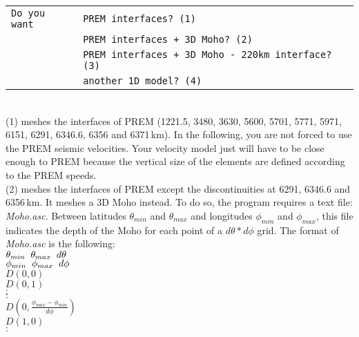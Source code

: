 \begin{itemize}[topsep=2pt,itemsep=4pt]
\hspace*{-0.3cm}
\begin{tabular}{ll}
\texttt{Do you want}
& \texttt{PREM interfaces? (1)}\\
& \texttt{PREM interfaces + 3D Moho? (2)}\\
& \texttt{PREM interfaces + 3D Moho - 220km interface? (3)}\\
& \texttt{another 1D model? (4)}
\end{tabular}\\
(1) meshes the interfaces of PREM (1221.5, 3480, 3630, 5600, 5701, 5771, 5971, 6151, 6291, 6346.6, 6356 and 6371\,km). In the following, you are not forced to use the PREM seismic velocities. Your velocity model just will have to be close enough to PREM because the vertical size of the elements are defined according to the PREM speeds.\\
(2) meshes the interfaces of PREM except the discontinuities at 6291, 6346.6 and 6356\,km. It meshes a 3D Moho instead. To do so, the program requires a text file: \textit{Moho.asc}. Between latitudes $\theta_{min}$ and $\theta_{max}$ and longitudes $\phi_{min}$ and $\phi_{max}$, this file indicates the depth of the Moho for each point of a $d\theta*d\phi$ grid. The format of \textit{Moho.asc} is the following:\\
\hspace*{1cm} $ \theta_{min} \hspace*{0.2cm} \theta_{max} \hspace*{0.2cm} d\theta$\\
\hspace*{1cm} $ \phi_{min} \hspace*{0.2cm} \phi_{max} \hspace*{0.2cm} d\phi$\\
\hspace*{1cm} $ D(0,0) $\\
\hspace*{1cm} $ D(0,1) $\\
\hspace*{1cm} $ : $\\
\hspace*{1cm} $ : $\\
\hspace*{1cm} $ D(0,\frac{\phi_{max}-\phi_{min}}{d\phi}) $\\
\hspace*{1cm} $ D(1,0) $\\
\hspace*{1cm} $ : $\\

\end{itemize}
